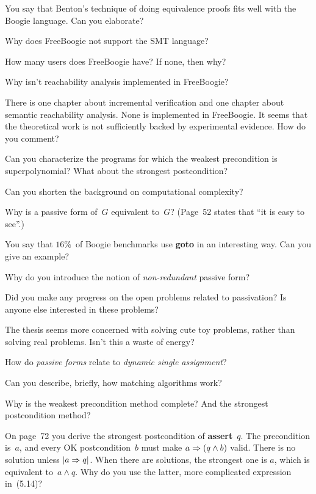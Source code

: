\Q You say that Benton's technique of doing equivalence proofs fits well
with the Boogie language. Can you elaborate?

\Q Why does FreeBoogie not support the SMT language?


\Q How many users does FreeBoogie have? If none, then why?

\Q Why isn't reachability analysis implemented in FreeBoogie?

\Q There is one chapter about incremental verification and one chapter
about semantic reachability analysis. None is implemented in FreeBoogie. It
seems that the theoretical work is not sufficiently backed by experimental
evidence.  How do you comment?

\Q Can you characterize the programs for which the weakest precondition is
superpolynomial? What about the strongest postcondition?

\Q Can you shorten the background on computational complexity?


\Q Why is a passive form of~$G$ equivalent to~$G$? (Page~52 states that ``it
is easy to see''.)

\Q You say that $16\%$~of Boogie benchmarks use {\bf goto} in an
interesting way. Can you give an example?

\Q Why do you introduce the notion of {\it non-redundant\/} passive
form?


\Q Did you make any progress on the open problems related to passivation?
Is anyone else interested in these problems?

\Q The thesis seems more concerned with solving cute toy problems, rather
than solving real problems. Isn't this a waste of energy?

\Q How do {\it passive forms\/} relate to {\it dynamic single assignment\/}?

\Q Can you describe, briefly, how matching algorithms work?

\Q Why is the weakest precondition method complete? And the strongest
postcondition method?

\Q On page~72 you derive the strongest postcondition of {\bf assert}~$q$.
The precondition is~$a$, and every OK postcondition~$b$ must make $a\Rightarrow
(q\land b)$ valid. There is no solution unless $|a\Rightarrow q|$.  When there
are solutions, the strongest one is $a$, which is equivalent to~$a\land q$.
Why do you use the latter, more complicated expression in~(5.14)?


